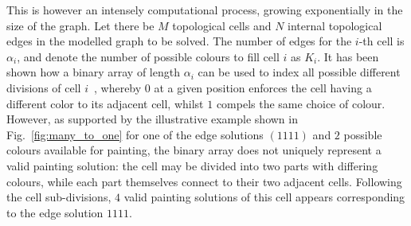 \documentclass[conference]{IEEEtran}
\begin{document}
This is however an intensely computational process, growing exponentially in the size of the graph. Let there be $M$ topological cells and $N$ internal topological edges in the modelled graph to be solved. The number of edges for the $i$-th cell is $\alpha_i$, and denote the number of possible colours to fill cell $i$ as $K_i$.   
It has been shown how a binary array of length $\alpha_i$ can be used to index all possible different divisions of cell $i$~\cite{Yang2020Cellular}, whereby 
$0$ at a given position enforces the cell having a different color to its adjacent cell, whilst $1$ compels the same choice of colour. 
However, as supported by the illustrative example shown in Fig.~\ref{fig:many_to_one} for one of the edge solutions $(1111)$ and $2$ possible colours available for painting, the binary array does not uniquely represent a valid painting solution: the cell may be divided into two parts with differing colours, while each part themselves connect to their two adjacent cells. Following the cell sub-divisions, $4$ valid painting solutions of this cell appears corresponding to the edge solution $1111$. 
\end{document}
